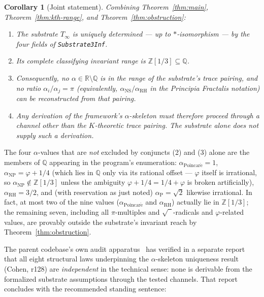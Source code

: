 \documentclass[11pt,a4paper]{article}
\theoremstyle{plain}
\newtheorem{corollary}[theorem]{Corollary}
\theoremstyle{definition}
\begin{document}
\begin{corollary}[Joint statement]
\label{cor:joint}
Combining Theorem~\ref{thm:main}, Theorem~\ref{thm:kth-range}, and Theorem~\ref{thm:obstruction}:

\begin{enumerate}[label=(\arabic*), leftmargin=2em]
  \item The substrate $T_{\infty}$ is uniquely determined --- up to $\ast$-isomorphism --- by the four fields of \texttt{Substrate3Inf}.
  \item Its complete classifying invariant range is $\mathbb{Z}[1/3] \subseteq \mathbb{Q}$.
  \item Consequently, no $\alpha \in \mathbb{R} \setminus \mathbb{Q}$ is in the range of the substrate's trace pairing, and no ratio $\alpha_i / \alpha_j = \pi$ (equivalently, $\alpha_{\mathrm{NS}} / \alpha_{\mathrm{RH}}$ in the Principia Fractalis notation) can be reconstructed from that pairing.
  \item Any derivation of the framework's $\alpha$-skeleton must therefore proceed through a channel other than the $K$-theoretic trace pairing. The substrate alone does not supply such a derivation.
\end{enumerate}
\end{corollary}

The four $\alpha$-values that are \emph{not} excluded by conjuncts (2) and (3) alone are the members of $\mathbb{Q}$ appearing in the program's enumeration: $\alpha_{\mathrm{Poincar\acute{e}}} = 1$, $\alpha_{\mathrm{NP}} = \varphi + 1/4$ (which lies in $\mathbb{Q}$ only via its rational offset --- $\varphi$ itself is irrational, so $\alpha_{\mathrm{NP}} \notin \mathbb{Z}[1/3]$ unless the ambiguity $\varphi + 1/4 = 1/4 + \varphi$ is broken artificially), $\alpha_{\mathrm{RH}} = 3/2$, and (with reservation as just noted) $\alpha_{\mathrm{P}} = \sqrt{2}$ likewise irrational. In fact, at most two of the nine values ($\alpha_{\mathrm{Poincar\acute{e}}}$ and $\alpha_{\mathrm{RH}}$) actually lie in $\mathbb{Z}[1/3]$; the remaining seven, including all $\pi$-multiples and $\sqrt{\phantom{2}}$-radicals and $\varphi$-related values, are provably outside the substrate's invariant reach by Theorem~\ref{thm:obstruction}.

The parent codebase's own audit apparatus~\cite{cohen_alpha_rigidity_2026} has verified in a separate report that all eight structural laws underpinning the $\alpha$-skeleton uniqueness result (Cohen, r128) are \emph{independent} in the technical sense: none is derivable from the formalized substrate assumptions through the tested channels. That report~\cite{cohen_alpha_rigidity_2026} concludes with the recommended standing sentence:
\end{document}
